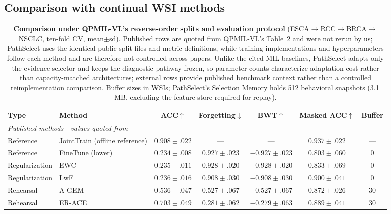 \documentclass{article}
\begin{document}
\subsection{Comparison with continual WSI methods}
\label{ssec:sota}

\begin{table}[t]
\centering\footnotesize
\caption{\textbf{Comparison under QPMIL-VL's reverse-order splits and evaluation protocol} (ESCA$\rightarrow$RCC$\rightarrow$BRCA$\rightarrow$NSCLC, ten-fold CV, mean$\pm$sd). Published rows are quoted from QPMIL-VL's Table~2 \cite{gou2025qpmil} and were not rerun by us; PathSelect uses the identical public split files and metric definitions, while training implementations and hyperparameters follow each method and are therefore not controlled across papers. Unlike the cited MIL baselines, PathSelect adapts only the evidence selector and keeps the diagnostic pathway frozen, so parameter counts characterize adaptation cost rather than capacity-matched architectures; external rows provide published benchmark context rather than a controlled reimplementation comparison. Buffer sizes in WSIs; PathSelect's Selection Memory holds 512 behavioral snapshots (3.1\,MB, excluding the feature store required for replay).}
\label{tab:sota}
\begin{tabular}{llccccc}
\toprule
Type & Method & ACC$\uparrow$ & Forgetting$\downarrow$ & BWT$\uparrow$ & Masked ACC$\uparrow$ & Buffer \\
\midrule
\multicolumn{7}{l}{\emph{Published methods---values quoted from \cite{gou2025qpmil}}} \\
Reference & JointTrain (offline reference) & $0.908{\pm}.022$ & --- & --- & $0.937{\pm}.022$ & --- \\
Reference & FineTune (lower) & $0.234{\pm}.008$ & $0.927{\pm}.023$ & $-0.927{\pm}.023$ & $0.803{\pm}.060$ & 0 \\
Regularization & EWC \cite{kirkpatrick2017ewc} & $0.235{\pm}.011$ & $0.928{\pm}.020$ & $-0.928{\pm}.020$ & $0.833{\pm}.069$ & 0 \\
Regularization & LwF \cite{li2017lwf} & $0.236{\pm}.016$ & $0.908{\pm}.030$ & $-0.908{\pm}.030$ & $0.900{\pm}.041$ & 0 \\
Rehearsal & A-GEM \cite{chaudhry2019agem} & $0.536{\pm}.047$ & $0.527{\pm}.067$ & $-0.527{\pm}.067$ & $0.872{\pm}.026$ & 30 \\
Rehearsal & ER-ACE \cite{caccia2022erace} & $0.703{\pm}.049$ & $0.281{\pm}.062$ & $-0.279{\pm}.063$ & $0.889{\pm}.041$ & 30 \\

\end{tabular}
\end{table}
\end{document}
